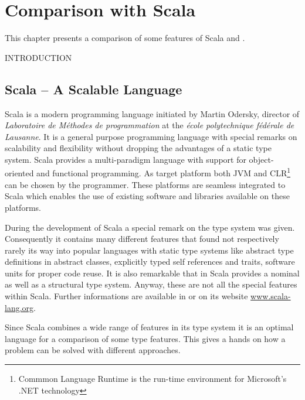 \chapter{Comparison with Scala}
\label{sec:comparisonScala}
This chapter presents a comparison of some features of Scala and \ooplss.

INTRODUCTION

\section{Scala -- A Scalable Language}
Scala is a modern programming language initiated by Martin Odersky,
director of \emph{Laboratoire de Méthodes de programmation} at the
\emph{école polytechnique fédérale de Lausanne}. It is a general
purpose programming language with special remarks on scalability
and flexibility without dropping the advantages of a static type
system. Scala provides a multi-paradigm language with support for
object-oriented and functional programming. As target platform both JVM
and CLR\footnote{Commmon Language Runtime is the run-time environment
for Microsoft's .NET technology} can be chosen by the programmer. These
platforms are seamless integrated to Scala which enables the use of
existing software and libraries available on these platforms.

During the development of Scala a special remark on the type system
was given. Consequently it contains many different features that found
not respectively rarely its way into popular languages with static
type systems like abstract type definitions in abstract classes,
explicitly typed self references and traits, software units for proper
code reuse. It is also remarkable that in Scala provides a nominal
as well as a structural type system. Anyway, these are not all the
special features within Scala. Further informations are available in
\cite{odersky_scala_2010,odersky_programming_2008} or on its website
\href{http://www.scala-lang.org/}{www.scala-lang.org}.

Since Scala combines a wide range of features in its type system it is
an optimal language for a comparison of some type features. This gives
a hands on how a problem can be solved with different approaches.

